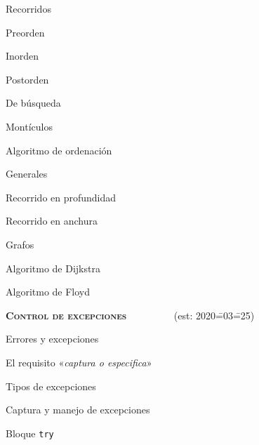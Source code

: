 \begin{longenum}
\begin{longenum}
\begin{longenum}
            \begin{longenum}
                \item Recorridos
                \begin{longenum}
                    \item Preorden
                    \item Inorden
                    \item Postorden
                \end{longenum}
            \end{longenum}
            \item De búsqueda
            \item Montículos
            \begin{longenum}
                \item Algoritmo de ordenación
            \end{longenum}
            \item Generales
            \begin{longenum}
                \item Recorrido en profundidad
                \item Recorrido en anchura
            \end{longenum}
        \end{longenum}
        \item Grafos
        \begin{longenum}
            \item Algoritmo de Dijkstra
            \item Algoritmo de Floyd
        \end{longenum}
    \end{longenum}
    \item \textbf{\textsc{Control de excepciones}} \ \ \ \ \ \ \ \ \ (est: 2020\==03\==25)
    \begin{longenum}
        \item Errores y excepciones
        \item El requisito «\textit{captura o especifica}»
        \begin{longenum}
            \item Tipos de excepciones
        \end{longenum}
        \item Captura y manejo de excepciones
        \begin{longenum}
            \item Bloque \texttt{try}

\end{longenum}
\end{longenum}
\end{longenum}
